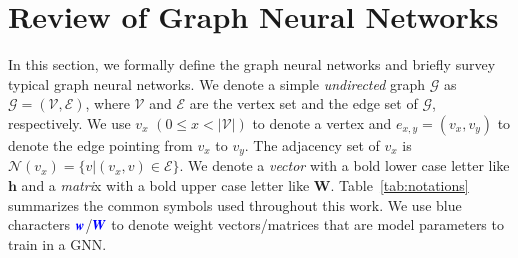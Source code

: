 \section{Review of Graph Neural Networks}
\label{sec:review_of_gnns}

In this section, we formally define the graph neural networks and briefly survey typical graph neural networks.
%
We denote a simple \emph{undirected} graph $\mathcal{G}$ as $\mathcal{G}=(\mathcal{V}, \mathcal{E})$, where $\mathcal{V}$ and $\mathcal{E}$ are the vertex set and the edge set of $\mathcal{G}$, respectively.
%
We use $v_x$ $(0 \leq x < |\mathcal{V}|)$ to denote a vertex and $e_{x,y}=(v_x, v_y)$ to denote the edge pointing from $v_x$ to $v_y$.
%
The adjacency set of $v_x$ is $\mathcal{N}(v_x)=\{v|(v_x, v) \in \mathcal{E}\}$.
%
We denote a \emph{vector} with a bold lower case letter like $\boldsymbol{h}$ and a \emph{matri}x with a bold upper case letter like $\boldsymbol{W}$.
%
Table~\ref{tab:notations} summarizes the common symbols used throughout this work.
%
We use blue characters $\textcolor{blue}{\boldsymbol{w}}$/$\textcolor{blue}{\boldsymbol{W}}$ to denote weight vectors/matrices that are model parameters to train in a GNN.

